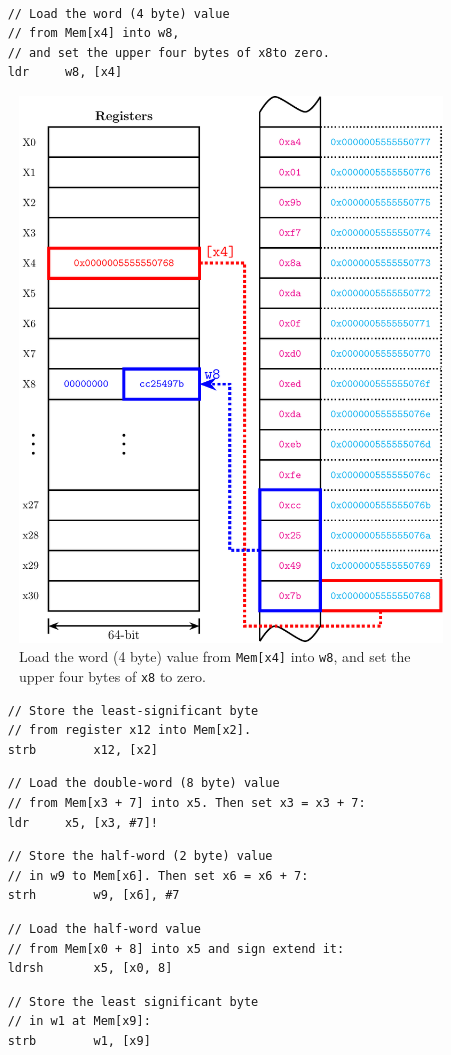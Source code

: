 \begin{example*} \ \\ 
\begin{lstlisting}
	// Load the word (4 byte) value
	// from Mem[x4] into w8,
	// and set the upper four bytes of x8to zero.
	ldr		w8, [x4]
\end{lstlisting}
\begin{figure}[h!]\centering
\includegraphics[width=.9\textwidth]{architectures/load-store-example1.pdf}
\caption{Load the word (4 byte) value from \texttt{Mem[x4]} into \texttt{w8}, and set the upper four bytes of \texttt{x8} to zero.}	
\end{figure}
\newpage
\begin{lstlisting}
	// Store the least-significant byte
	// from register x12 into Mem[x2].
	strb		x12, [x2]
\end{lstlisting}
\begin{lstlisting}
	// Load the double-word (8 byte) value
	// from Mem[x3 + 7] into x5. Then set x3 = x3 + 7:
	ldr		x5, [x3, #7]!
\end{lstlisting}
\begin{lstlisting}
	// Store the half-word (2 byte) value
	// in w9 to Mem[x6]. Then set x6 = x6 + 7:
	strh		w9, [x6], #7
\end{lstlisting}
\begin{lstlisting}
	// Load the half-word value
	// from Mem[x0 + 8] into x5 and sign extend it:
	ldrsh		x5, [x0, 8]
\end{lstlisting}
\begin{lstlisting}
	// Store the least significant byte
	// in w1 at Mem[x9]:
	strb		w1, [x9]
\end{lstlisting}
\end{example*}

